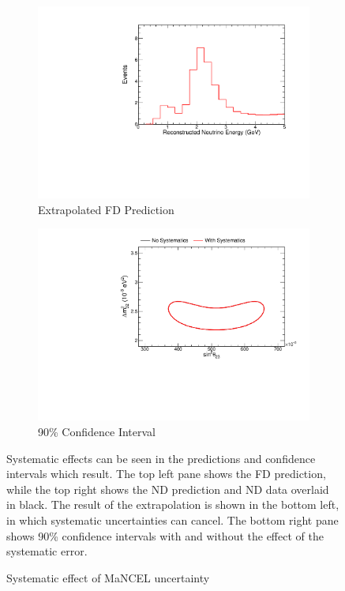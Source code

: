 {\begin{figure}
\begin{center}
\vspace{20pt}

\begin{subfigure}[c]{0.49\textwidth}
\includegraphics[width=\textwidth]{figures/systs/prediction/fd_extrap_prediction_MaNCEL.pdf}
\caption*{Extrapolated FD Prediction}
\end{subfigure}
\begin{subfigure}[c]{0.49\textwidth}
\includegraphics[width=\textwidth]{figures/systs/prediction/fd_extrap_contour_MaNCEL.pdf}
\caption*{90\% Confidence Interval}
\end{subfigure}
\end{center}
\caption{Systematic effect of MaNCEL uncertainty}{
Systematic effects can be seen in the predictions and confidence intervals
which result.
The top left pane shows the FD prediction, while the top right shows the
ND prediction and ND data overlaid in black.
The result of the extrapolation is shown in the bottom left, in which
systematic uncertainties can cancel.
The bottom right pane shows 90\% confidence intervals with and without
the effect of the systematic error.}
\label{syst_fig_MaNCEL}


\end{figure}}
